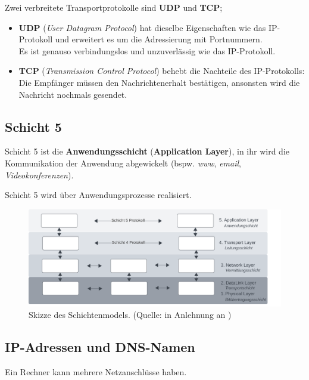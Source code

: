 \noindent
Zwei verbreitete Transportprotokolle sind \textbf{UDP} und \textbf{TCP};

\begin{itemize}
    \item \textbf{UDP} (\textit{User Datagram Protocol}) hat dieselbe Eigenschaften wie das IP-Protokoll und erweitert es um die Adressierung mit Portnummern.\\
    Es ist genauso verbindungslos und unzuverlässig wie das IP-Protokoll.
    \item \textbf{TCP} (\textit{Transmission Control Protocol}) behebt die Nachteile des IP-Protokolls: Die Empfänger müssen den Nachrichtenerhalt bestätigen, ansonsten wird die Nachricht nochmals gesendet.
\end{itemize}


\subsection*{Schicht 5}
Schicht 5 ist die \textbf{Anwendungsschicht} (\textbf{Application Layer}), in ihr wird die Kommunikation der Anwendung abgewickelt (bspw. \textit{www}, \textit{email}, \textit{Videokonferenzen}).


\begin{tcolorbox}
    Schicht 5 wird über Anwendungsprozesse realisiert.
\end{tcolorbox}


\begin{figure}
    \centering
    \includegraphics[width=16cm]{chapters/fopt5/img/layers}
    \caption{Skizze des Schichtenmodels. (Quelle: in Anlehnung an \cite[257, Bild 5.2]{Oec22})}
    \label{fig:layers}
\end{figure}


\subsection{IP-Adressen und DNS-Namen}

Ein Rechner kann mehrere Netzanschlüsse haben.\\

